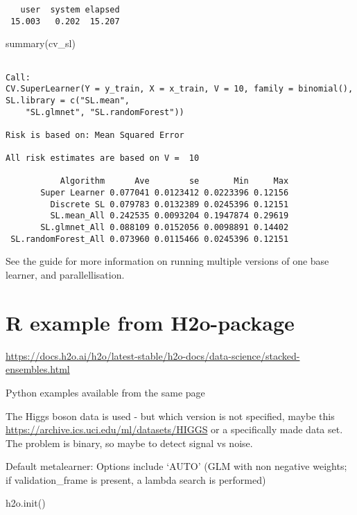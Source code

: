 \documentclass[
  letterpaper,
  DIV=11,
  numbers=noendperiod]{scrartcl}
\newenvironment{Shaded}{\begin{snugshade}}{\end{snugshade}}
\newcommand{\FunctionTok}[1]{\textcolor[rgb]{0.28,0.35,0.67}{#1}}
\newcommand{\NormalTok}[1]{\textcolor[rgb]{0.00,0.23,0.31}{#1}}
\begin{document}
\begin{verbatim}
   user  system elapsed 
 15.003   0.202  15.207 
\end{verbatim}

\begin{Shaded}
\begin{Highlighting}[]
\FunctionTok{summary}\NormalTok{(cv\_sl)}
\end{Highlighting}
\end{Shaded}

\begin{verbatim}

Call:  
CV.SuperLearner(Y = y_train, X = x_train, V = 10, family = binomial(), SL.library = c("SL.mean",  
    "SL.glmnet", "SL.randomForest")) 

Risk is based on: Mean Squared Error

All risk estimates are based on V =  10 

           Algorithm      Ave        se       Min     Max
       Super Learner 0.077041 0.0123412 0.0223396 0.12156
         Discrete SL 0.079783 0.0132389 0.0245396 0.12151
         SL.mean_All 0.242535 0.0093204 0.1947874 0.29619
       SL.glmnet_All 0.088109 0.0152056 0.0098891 0.14402
 SL.randomForest_All 0.073960 0.0115466 0.0245396 0.12151
\end{verbatim}

See the guide for more information on running multiple versions of one
base learner, and parallellisation.

\hypertarget{r-example-from-h2o-package}{%
\section{R example from H2o-package}\label{r-example-from-h2o-package}}

\url{https://docs.h2o.ai/h2o/latest-stable/h2o-docs/data-science/stacked-ensembles.html}

Python examples available from the same page

The Higgs boson data is used - but which version is not specified, maybe
this \url{https://archive.ics.uci.edu/ml/datasets/HIGGS} or a
specifically made data set. The problem is binary, so maybe to detect
signal vs noise.

Default metalearner: Options include `AUTO' (GLM with non negative
weights; if validation\_frame is present, a lambda search is performed)

\begin{Shaded}
\begin{Highlighting}[]
\FunctionTok{h2o.init}\NormalTok{()}
\end{Highlighting}
\end{Shaded}
\end{document}
